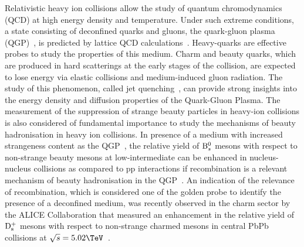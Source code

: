 
\maketitle

Relativistic heavy ion collisions allow the study of quantum chromodynamics (QCD) at high energy density and temperature. Under such extreme conditions, a state consisting of deconfined 
quarks and gluons, the quark-gluon plasma (QGP)~\cite{QGP1,QGP2}, is predicted by lattice QCD calculations~\cite{Karsch:2003jg}. Heavy-quarks are effective probes to study the 
properties of this medium. Charm and beauty quarks, which are produced in hard scatterings at the early stages of the collision, are expected to lose energy via elastic collisions and 
medium-induced gluon radiation. The study of this phenomenon, called jet quenching~\cite{Eloss1,Baier:2000mf,Chatrchyan:2011sx,Aad:2010bu}, can provide strong insights into the 
energy density and diffusion properties of the Quark-Gluon Plasma.  The measurement of the suppression of strange beauty particles in heavy-ion collisions is 
also considered of fundamental importance to study the mechanisms of beauty hadronisation in heavy ion collisions. In presence of a medium with increased strangeness content 
as the QGP~\cite{ABELEV:2013zaa}, the relative yield of ${\mathrm{B}_{s}^{0}}$ mesons with respect to non-strange beauty mesons at low-intermediate \pt can be enhanced in nucleus-nucleus 
collisions as compared to pp interactions if recombination is a relevant mechanism of beauty hadronisation in the QGP~\cite{Molnar:2003ff,Greco:2003mm,Greco:2003vf}. 
An indication of the relevance of recombination, which is considered one of the golden probe to identify the presence of a deconfined medium, was recently observed in the charm sector by the ALICE 
Collaboration that measured an enhancement in the relative yield of $\mathrm{D_{s}^{+}}$ mesons with respect to non-strange charmed mesons in central PbPb collisions at $\sqrts=5.02\TeV$~\cite{Adam2016Ds}.

